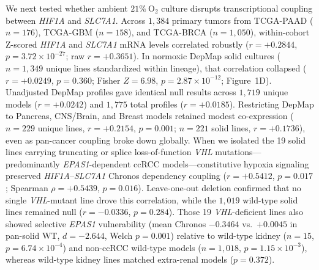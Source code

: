 \documentclass[10pt,twocolumn]{article}
\begin{document}
We next tested whether ambient $21\%\ \text{O}_2$ culture disrupts transcriptional coupling between \textit{HIF1A} and \textit{SLC7A1}. Across $1,384$ primary tumors from TCGA-PAAD ($n = 176$), TCGA-GBM ($n = 158$), and TCGA-BRCA ($n = 1,050$), within-cohort Z-scored \textit{HIF1A} and \textit{SLC7A1} mRNA levels correlated robustly ($r = +0.2844$, $p = 3.72 \times 10^{-27}$; raw $r = +0.3651$). In normoxic DepMap solid cultures ($n = 1,349$ unique lines standardized within lineage), that correlation collapsed ($r = +0.0249$, $p = 0.360$; Fisher $Z = 6.98$, $p = 2.87 \times 10^{-12}$; Figure~1D). Unadjusted DepMap profiles gave identical null results across $1,719$ unique models ($r = +0.0242$) and $1,775$ total profiles ($r = +0.0185$). Restricting DepMap to Pancreas, CNS/Brain, and Breast models retained modest co-expression ($n = 229$ unique lines, $r = +0.2154$, $p = 0.001$; $n = 221$ solid lines, $r = +0.1736$), even as pan-cancer coupling broke down globally. When we isolated the 19 solid lines carrying truncating or splice loss-of-function \textit{VHL} mutations---predominantly \textit{EPAS1}-dependent ccRCC models---constitutive hypoxia signaling preserved \textit{HIF1A}--\textit{SLC7A1} Chronos dependency coupling ($r = +0.5412$, $p = 0.017$; Spearman $\rho = +0.5439$, $p = 0.016$). Leave-one-out deletion confirmed that no single \textit{VHL}-mutant line drove this correlation, while the $1,019$ wild-type solid lines remained null ($r = -0.0336$, $p = 0.284$). Those 19 \textit{VHL}-deficient lines also showed selective \textit{EPAS1} vulnerability (mean Chronos $-0.3464$ vs.\ $+0.0045$ in pan-solid WT, $d = -2.644$, Welch $p = 0.001$) relative to wild-type kidney ($n = 15$, $p = 6.74 \times 10^{-4}$) and non-ccRCC wild-type models ($n = 1,018$, $p = 1.15 \times 10^{-3}$), whereas wild-type kidney lines matched extra-renal models ($p = 0.372$).
\end{document}
